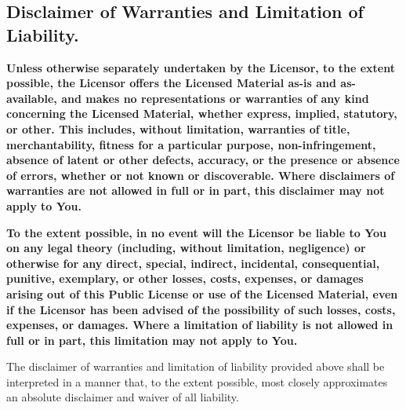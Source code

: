   \subsection{Disclaimer of Warranties and Limitation of Liability.}
    \begin{myEnumerate}
      \item \textbf{Unless otherwise separately undertaken by the Licensor, to the extent possible, the Licensor offers the
      Licensed Material as-is and as-available, and makes no representations or warranties of any kind concerning the
      Licensed Material, whether express, implied, statutory, or other. This includes, without limitation, warranties of
      title, merchantability, fitness for a particular purpose, non-infringement, absence of latent or other defects,
      accuracy, or the presence or absence of errors, whether or not known or discoverable. Where disclaimers of warranties
      are not allowed in full or in part, this disclaimer may not apply to You.}
      \item \textbf{To the extent possible, in no event will the Licensor be liable to You on any legal theory (including,
      without limitation, negligence) or otherwise for any direct, special, indirect, incidental, consequential, punitive,
      exemplary, or other losses, costs, expenses, or damages arising out of this Public License or use of the Licensed
      Material, even if the Licensor has been advised of the possibility of such losses, costs, expenses, or damages. Where a
      limitation of liability is not allowed in full or in part, this limitation may not apply to You.}
      \item The disclaimer of warranties and limitation of liability provided above shall be interpreted in a manner that, to
      the extent possible, most closely approximates an absolute disclaimer and waiver of all liability.
    \end{myEnumerate}

